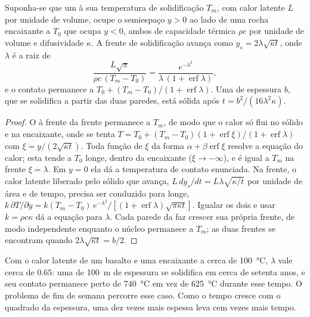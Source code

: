 \begin{proposition}\label{prop:b2:magma-emplacement:stefan}
Suponha-se que um  à sua temperatura de solidificação $T_m$, com calor latente $L$ por unidade
de volume, ocupe o semiespaço $y > 0$ ao lado de uma rocha encaixante a $T_0$ que ocupa $y < 0$, ambos
de capacidade térmica $\rho c$ por unidade de volume e difusividade $\kappa$. A
frente de solidificação avança como $y_s = 2\lambda\sqrt{\kappa t}$, onde $\lambda$
é a raiz de
\[
\frac{L\sqrt\pi}{\rho c\,(T_m - T_0)} = \frac{e^{-\lambda^2}}{\lambda\,(1 + \operatorname{erf}\lambda)},
\]
e o contato permanece a $T_0 + (T_m - T_0)/(1 + \operatorname{erf}\lambda)$. Uma 
de espessura $b$, que se solidifica a partir das duas paredes, está sólida após
$t = b^2/(16\lambda^2\kappa)$.
\end{proposition}

\begin{proof}
O  à frente da frente permanece a $T_m$, de modo que o calor só flui no sólido
e na encaixante, onde se tenta $T = T_0 + (T_m - T_0)(1 + \operatorname{erf}\xi)/(1 +
\operatorname{erf}\lambda)$ com $\xi = y/(2\sqrt{\kappa t})$. Toda função de $\xi$
da forma $\alpha + \beta\operatorname{erf}\xi$ resolve a equação do calor; esta
tende a $T_0$ longe, dentro da encaixante ($\xi \to -\infty$), e é igual a $T_m$ na frente
$\xi = \lambda$. Em $y = 0$ ela dá a temperatura de contato enunciada. Na frente,
o calor latente liberado pelo sólido que avança, $L\,dy_s/dt = L\lambda\sqrt{\kappa/t}$
por unidade de área e de tempo, precisa ser conduzido para longe, $k\,\partial T/\partial y = k(T_m -
T_0)\,e^{-\lambda^2}/[(1 + \operatorname{erf}\lambda)\sqrt{\pi\kappa t}]$. Igualar os
dois e usar $k = \rho c\kappa$ dá a equação para $\lambda$. Cada parede da
 faz crescer sua própria frente, de modo independente enquanto o núcleo permanece a $T_m$; as duas
frentes se encontram quando $2\lambda\sqrt{\kappa t} = b/2$.
\end{proof}

Com o calor latente de um basalto e uma encaixante a cerca de \qty{100}{\celsius},
$\lambda$ vale cerca de $0.65$: uma  de \qty{100}{m} de espessura se solidifica em cerca de
setenta anos, e seu contato permanece perto de \qty{740}{\celsius} em vez de
\qty{625}{\celsius} durante esse tempo. O problema de fim de semana percorre esse caso.
Como o tempo cresce com o quadrado da espessura, uma  dez vezes mais espessa
leva cem vezes mais tempo.

